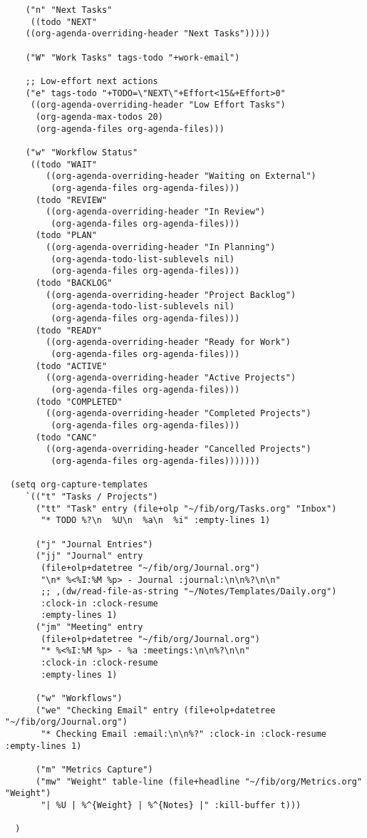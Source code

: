 \documentclass[11pt]{article}
\begin{document}
\begin{verbatim}
    ("n" "Next Tasks"
     ((todo "NEXT"
	((org-agenda-overriding-header "Next Tasks")))))

    ("W" "Work Tasks" tags-todo "+work-email")

    ;; Low-effort next actions
    ("e" tags-todo "+TODO=\"NEXT\"+Effort<15&+Effort>0"
     ((org-agenda-overriding-header "Low Effort Tasks")
      (org-agenda-max-todos 20)
      (org-agenda-files org-agenda-files)))

    ("w" "Workflow Status"
     ((todo "WAIT"
	    ((org-agenda-overriding-header "Waiting on External")
	     (org-agenda-files org-agenda-files)))
      (todo "REVIEW"
	    ((org-agenda-overriding-header "In Review")
	     (org-agenda-files org-agenda-files)))
      (todo "PLAN"
	    ((org-agenda-overriding-header "In Planning")
	     (org-agenda-todo-list-sublevels nil)
	     (org-agenda-files org-agenda-files)))
      (todo "BACKLOG"
	    ((org-agenda-overriding-header "Project Backlog")
	     (org-agenda-todo-list-sublevels nil)
	     (org-agenda-files org-agenda-files)))
      (todo "READY"
	    ((org-agenda-overriding-header "Ready for Work")
	     (org-agenda-files org-agenda-files)))
      (todo "ACTIVE"
	    ((org-agenda-overriding-header "Active Projects")
	     (org-agenda-files org-agenda-files)))
      (todo "COMPLETED"
	    ((org-agenda-overriding-header "Completed Projects")
	     (org-agenda-files org-agenda-files)))
      (todo "CANC"
	    ((org-agenda-overriding-header "Cancelled Projects")
	     (org-agenda-files org-agenda-files)))))))

 (setq org-capture-templates
    `(("t" "Tasks / Projects")
      ("tt" "Task" entry (file+olp "~/fib/org/Tasks.org" "Inbox")
	   "* TODO %?\n  %U\n  %a\n  %i" :empty-lines 1)

      ("j" "Journal Entries")
      ("jj" "Journal" entry
	   (file+olp+datetree "~/fib/org/Journal.org")
	   "\n* %<%I:%M %p> - Journal :journal:\n\n%?\n\n"
	   ;; ,(dw/read-file-as-string "~/Notes/Templates/Daily.org")
	   :clock-in :clock-resume
	   :empty-lines 1)
      ("jm" "Meeting" entry
	   (file+olp+datetree "~/fib/org/Journal.org")
	   "* %<%I:%M %p> - %a :meetings:\n\n%?\n\n"
	   :clock-in :clock-resume
	   :empty-lines 1)

      ("w" "Workflows")
      ("we" "Checking Email" entry (file+olp+datetree "~/fib/org/Journal.org")
	   "* Checking Email :email:\n\n%?" :clock-in :clock-resume :empty-lines 1)

      ("m" "Metrics Capture")
      ("mw" "Weight" table-line (file+headline "~/fib/org/Metrics.org" "Weight")
       "| %U | %^{Weight} | %^{Notes} |" :kill-buffer t)))

  )
\end{verbatim}
\end{document}
